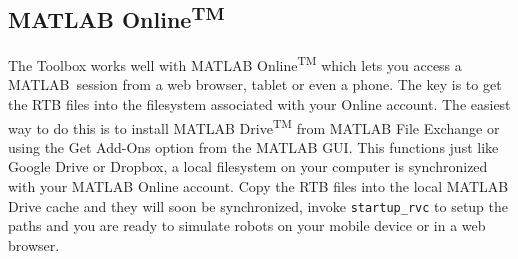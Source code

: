 \documentclass[a4paper,twoside]{report}
\def\Mlab{MATLAB}
\begin{document}
\subsection{MATLAB Online\textsuperscript{TM}}
The Toolbox works well with MATLAB Online\textsuperscript{TM} which lets you access a \Mlab\ session from a web browser, tablet 
or even a phone.
The key is to get the RTB files into the filesystem associated with your Online account.  The easiest way to do this is to install
MATLAB Drive\textsuperscript{TM} from MATLAB File Exchange or using the Get Add-Ons option from the MATLAB GUI.  This functions
just like Google Drive or Dropbox, a local filesystem on your computer is synchronized with your MATLAB Online account.  Copy the RTB
files into the local MATLAB Drive cache and they will soon be synchronized, invoke \texttt{startup\_rvc} to setup the paths and you are ready to simulate robots on your mobile device or in a web browser.
\end{document}
